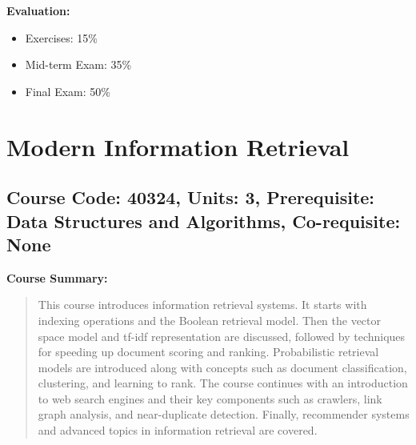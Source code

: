 \documentclass[12pt]{article}
\begin{document}
\textbf{Evaluation:}
\begin{itemize}
    \item Exercises: 15\%
    \item Mid-term Exam: 35\%
    \item Final Exam: 50\%
\end{itemize}

\newpage

\section{Modern Information Retrieval}
\subsection*{Course Code: 40324, Units: 3, Prerequisite: Data Structures and Algorithms, Co-requisite: None}

\textbf{Course Summary:} 
\begin{quote}
    This course introduces information retrieval systems. It starts with indexing operations and the Boolean retrieval model. Then the vector space model and tf-idf representation are discussed, followed by techniques for speeding up document scoring and ranking. Probabilistic retrieval models are introduced along with concepts such as document classification, clustering, and learning to rank. The course continues with an introduction to web search engines and their key components such as crawlers, link graph analysis, and near-duplicate detection. Finally, recommender systems and advanced topics in information retrieval are covered.
\end{quote}
\end{document}
